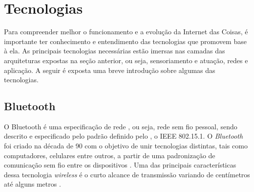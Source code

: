 

\section{Tecnologias}


Para compreender melhor o funcionamento e a evolução da Internet das Coisas, é importante ter conhecimento e entendimento das tecnologias que promovem base à ela. As principais tecnologias necessárias estão imersas nas camadas das arquiteturas expostas na seção anterior, ou seja, sensoriamento e atuação, redes e aplicação. A seguir é exposta uma breve introdução sobre algumas das tecnologias.

\subsection{Bluetooth}

O Bluetooth é uma especificação de rede  , ou seja, rede sem fio pessoal, sendo descrito e especificado pelo padrão definido pelo , o IEEE 802.15.1. O \textit{Bluetooth} foi criado na década de 90 com o objetivo de unir tecnologias distintas, tais como computadores, celulares entre outros, a partir de uma padronização de comunicação sem fio entre os dispositivos \cite{Kardach2008}. 
Uma das principais características dessa tecnologia \textit{wireless} é o curto alcance de transmissão variando de centímetros até alguns metros \cite{Huang2007}. 

